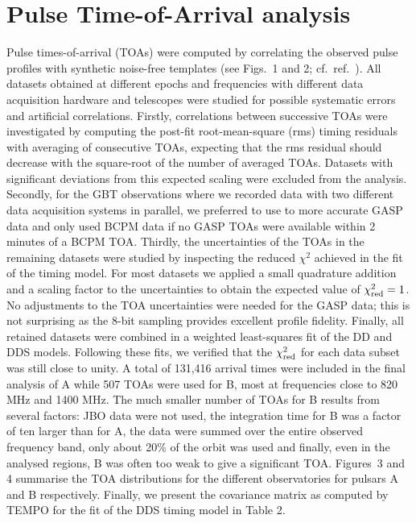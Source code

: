 \documentclass[12pt,psfig]{article}
\begin{document}
\section{Pulse Time-of-Arrival analysis}

Pulse times-of-arrival (TOAs) were computed by
correlating the observed pulse profiles with synthetic noise-free templates
(see Figs.~1 and 2; cf.~ref.~\cite{kll+99}).
All datasets obtained at different
epochs and frequencies with different data acquisition hardware and
telescopes were studied for possible systematic errors and artificial
correlations.  Firstly, correlations between successive TOAs were
investigated by computing the post-fit root-mean-square (rms) timing
residuals with averaging of consecutive TOAs, expecting that the rms
residual should decrease with the square-root of the number of
averaged TOAs.  Datasets with significant deviations from this
expected scaling were excluded from the analysis. Secondly, for the
GBT observations where we recorded data with two different data
acquisition systems in parallel, we preferred to use to more accurate
GASP data and only used BCPM data if no GASP TOAs were available
within 2 minutes of a BCPM TOA.  Thirdly, the uncertainties of the
TOAs in the remaining datasets were studied by inspecting the reduced
$\chi^2$ achieved in the fit of the timing model.  For most datasets
we applied a small quadrature addition and a scaling factor to the
uncertainties to obtain the expected value of $\chi^2_{\rm red}=1$. No
adjustments to the TOA uncertainties were needed for the GASP data;
this is not surprising as the 8-bit sampling provides excellent
profile fidelity.  Finally, all retained datasets were combined in a
weighted least-squares fit of the DD and DDS models. Following these
fits, we verified that the $\chi^2_{\rm red}$ for each data subset was
still close to unity.  A total of 131,416 arrival times were included
in the final analysis of A while 507 TOAs were used for B, most at
frequencies close to 820 MHz and 1400 MHz. The much smaller number of
TOAs for B results from several factors: JBO data were not used, the
integration time for B was a factor of ten larger than for A, the data were
summed over the entire observed frequency band, only about 20\% of the
orbit was used and finally, even in the analysed regions, B was often
too weak to give a significant TOA.  Figures~3 and 4
summarise the TOA distributions for the different
observatories for pulsars A and B respectively. Finally, we present
the covariance matrix as computed by TEMPO for the fit of the DDS
timing model in Table 2.
\end{document}
